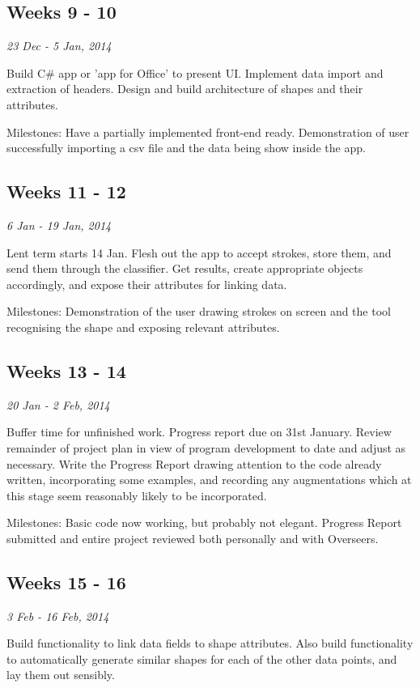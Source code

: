 \subsection*{Weeks 9 - 10}
\emph{23 Dec - 5 Jan, 2014}

Build C\# app or 'app for Office' to present UI. Implement data import and extraction of headers. Design and build architecture of shapes and their attributes. 

Milestones: Have a partially implemented front-end ready. Demonstration of user successfully importing a csv file and the data being show inside the app.



\subsection*{Weeks 11 - 12}
\emph{6 Jan - 19 Jan, 2014}

Lent term starts 14 Jan. Flesh out the app to accept strokes, store them, and send them through the classifier. Get results, create appropriate objects accordingly, and expose their attributes for linking data.

Milestones: Demonstration of the user drawing strokes on screen and the tool recognising the shape and exposing relevant attributes. 


\subsection*{Weeks 13 - 14}
\emph{20 Jan - 2 Feb, 2014}

Buffer time for unfinished work. Progress report due on 31st January. Review remainder of project plan in view of program development to date and adjust as necessary.  Write the Progress Report drawing attention to the code already written, incorporating some examples, and recording any augmentations which at this stage seem reasonably likely to be incorporated.

Milestones: Basic code now working, but probably not elegant. Progress Report submitted and entire project reviewed both personally and with Overseers.

\subsection*{Weeks 15 - 16}
\emph{3 Feb - 16 Feb, 2014}

Build functionality to link data fields to shape attributes. Also build functionality to automatically generate similar shapes for each of the other data points, and lay them out sensibly.

